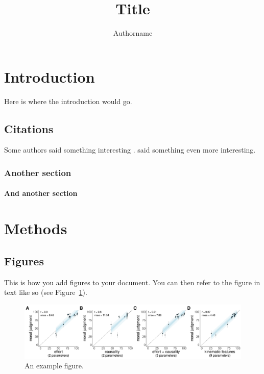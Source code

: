 \documentclass[doc,natbib,floatsintext]{apa7}
\title{Title}
\author{Authorname}
\affiliation{Affiliation}
\begin{document}
\maketitle

\section{Introduction} 

Here is where the introduction would go. 


\subsection{Citations}

Some authors said something interesting \citep{gerstenberg2021csm}. \cite{gelman1986categories} said something even more interesting.

\subsubsection{Another section}

\lipsum[1]

\paragraph{And another section}

\lipsum[1]

\section{Methods}

\subsection{Figures}

This is how you add figures to your document. You can then refer to the figure in text like so (see Figure~\ref{fig:example_figure}). 

\begin{figure}[t]
    \centering
    \includegraphics[width=0.99\columnwidth]{example_figure}
    \caption{An example figure.}
    \label{fig:example_figure}
\end{figure}
\end{document}
